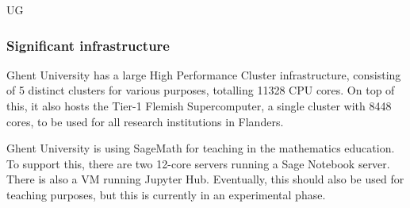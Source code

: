 \begin{sitedescription}{UG}
\subsubsection*{Significant infrastructure}

Ghent University has a large High Performance Cluster infrastructure,
consisting of 5 distinct clusters for various purposes, totalling 11328 CPU cores.
On top of this, it also hosts the Tier-1 Flemish Supercomputer,
a single cluster with 8448 cores, to be used for all research institutions in Flanders.

Ghent University is using SageMath for teaching in the mathematics education.
To support this, there are two 12-core servers running a Sage Notebook server.
There is also a VM running Jupyter Hub.
Eventually, this should also be used for teaching purposes,
but this is currently in an experimental phase.
\end{sitedescription}
